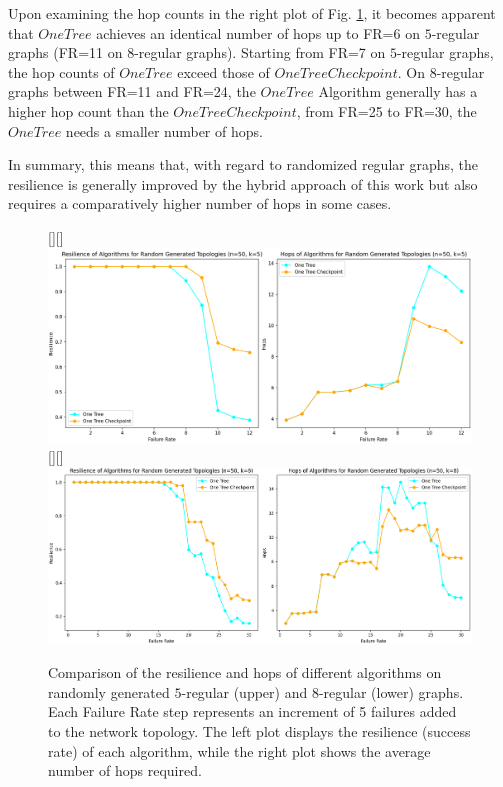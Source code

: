 \documentclass[conference]{IEEEtran}
\begin{document}
Upon examining the hop counts in the right plot of Fig. \ref{regulartopofig}, it becomes apparent that $OneTree$ achieves an identical number of hops up to FR=6 on $5$-regular graphs (FR=11 on $8$-regular graphs). Starting from FR=7 on $5$-regular graphs, the hop counts of $OneTree$ exceed those of $OneTreeCheckpoint$.
On $8$-regular graphs between FR=11 and FR=24, the $OneTree$ Algorithm generally has a higher hop count than the $One Tree Checkpoint$, from FR=25 to FR=30, the $One Tree$ needs a smaller number of hops.

In summary, this means that, with regard to randomized regular graphs, the resilience is generally improved by the hybrid approach of this work but also requires a comparatively higher number of hops in some cases.

\begin{figure}[t]
    \centering
    \raisebox{0pt}[\height][\depth]{\hspace*{-1em}\includegraphics[scale=0.1, width=\linewidth]{figures/k5.png}}\\
    \raisebox{0pt}[\height][\depth]{\hspace*{-1em}\includegraphics[scale=0.1, width=\linewidth]{figures/k8.png}}
    \caption{Comparison of the resilience and hops of different algorithms on randomly generated $5$-regular (upper) and $8$-regular (lower) graphs. 
    Each Failure Rate step represents an increment of 5 failures added to the network topology. The left plot displays the resilience (success rate) of each algorithm, while the right plot shows the average number of hops required.}
    \label{regulartopofig}
\end{figure}
\end{document}
